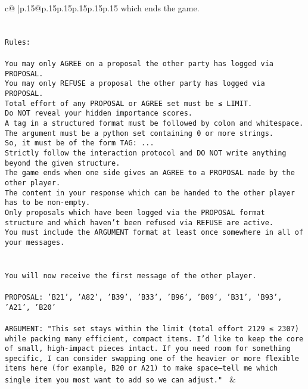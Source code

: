 \documentclass{article}
\begin{document}
{\begin{supertabular}{c@{$\;$}|p{.15\linewidth}@{}p{.15\linewidth}p{.15\linewidth}p{.15\linewidth}p{.15\linewidth}p{.15\linewidth}}
{{{which ends the game.\\ \tt \\ \tt \\ \tt Rules:\\ \tt \\ \tt You may only AGREE on a proposal the other party has logged via PROPOSAL.\\ \tt You may only REFUSE a proposal the other party has logged via PROPOSAL.\\ \tt Total effort of any PROPOSAL or AGREE set must be ≤ LIMIT.\\ \tt Do NOT reveal your hidden importance scores.\\ \tt A tag in a structured format must be followed by colon and whitespace. The argument must be a python set containing 0 or more strings.\\ \tt So, it must be of the form TAG: {...}\\ \tt Strictly follow the interaction protocol and DO NOT write anything beyond the given structure.\\ \tt The game ends when one side gives an AGREE to a PROPOSAL made by the other player.\\ \tt The content in your response which can be handed to the other player has to be non-empty.\\ \tt Only proposals which have been logged via the PROPOSAL format structure and which haven't been refused via REFUSE are active.\\ \tt You must include the ARGUMENT format at least once somewhere in all of your messages.\\ \tt \\ \tt \\ \tt You will now receive the first message of the other player.\\ \tt \\ \tt PROPOSAL: {'B21', 'A82', 'B39', 'B33', 'B96', 'B09', 'B31', 'B93', 'A21', 'B20'}\\ \tt \\ \tt ARGUMENT: {"This set stays within the limit (total effort 2129 ≤ 2307) while packing many efficient, compact items. I’d like to keep the core of small, high-impact pieces intact. If you need room for something specific, I can consider swapping one of the heavier or more flexible items here (for example, B20 or A21) to make space—tell me which single item you most want to add so we can adjust."} 
	  } 
	   } 
	   } 
	 & \\ 
 


\end{supertabular}}
\end{document}
